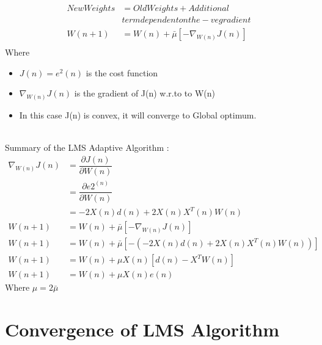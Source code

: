 \documentclass[journal,12pt,twocolumn]{IEEEtran}
\begin{document}
\begin{align*}
New Weights&=Old Weights  + Additional \\&term dependent on the -ve gradient\\
W(n+1)&=W(n) + \bar{\mu}[- \nabla_{W(n)}J(n)]\\
\end{align*}
Where
\begin{itemize}
\item $J(n) = e^{2}(n)$ is the cost function
\item $\nabla_{W(n)}J(n)$ is the gradient of J(n) w.r.to to W(n)
\item In this case J(n) is convex, it will converge to Global optimum.\\ \\
\end{itemize}
Summary of the LMS Adaptive Algorithm :\\
\begin{align*}
\nabla_{W(n)}J(n)&=\dfrac{\partial J(n)}{\partial W(n)}\\
&=\dfrac{\partial e{2}^(n)}{\partial W(n)}\\
&=- 2X(n)d(n) + 2 X(n) X^{T}(n)W(n)\\
W(n+1)&=W(n) + \bar{\mu}[- \nabla_{W(n)}J(n)]\\
W(n+1)&=W(n) + \bar{\mu}[-(-2X(n)d(n) + 2 X(n) X^{T}(n)W(n))]\\
W(n+1)&=W(n) + \mu X(n)[d(n)-X^{T}W(n)]\\
W(n+1)&=W(n)+ \mu X(n) e(n)
\end{align*}
Where  $\mu = 2 \bar{\mu}$
\section{Convergence of LMS Algorithm}
\end{document}
